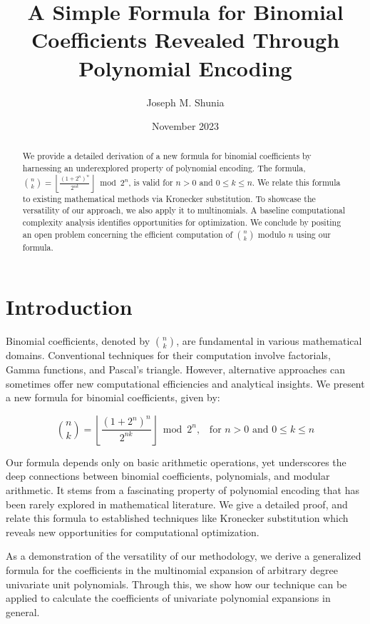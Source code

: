 \documentclass{article}
\title{A Simple Formula for Binomial Coefficients Revealed Through Polynomial Encoding}
\author{Joseph M. Shunia}
\date{November 2023}
\theoremstyle{plain}
\theoremstyle{definition}
\begin{document}
\maketitle
\linespread{1.3}
\begin{abstract}
We provide a detailed derivation of a new formula for binomial coefficients by harnessing an underexplored property of polynomial encoding. The formula, $\binom{n}{k} = \left\lfloor\frac{(1 + 2^{n})^{n}}{2^{n k}}\right\rfloor \bmod{2^{n}}$, is valid for $n > 0$ and $0 \leq k \leq n$. We relate this formula to existing mathematical methods via Kronecker substitution. To showcase the versatility of our approach, we also apply it to multinomials. A baseline computational complexity analysis identifies opportunities for optimization. We conclude by positing an open problem concerning the efficient computation of $\binom{n}{k}$ modulo $n$ using our formula.
\end{abstract}
\linespread{1.0}

\section{Introduction}
Binomial coefficients, denoted by \(\binom{n}{k}\), are fundamental in various mathematical domains. Conventional techniques for their computation involve factorials, Gamma functions, and Pascal's triangle. However, alternative approaches can sometimes offer new computational efficiencies and analytical insights. We present a new formula for binomial coefficients, given by:

\begin{equation}
\binom{n}{k} = \left\lfloor\frac{(1 + 2^{n})^{n}}{2^{n k}}\right\rfloor \bmod{2^{n}} \text{,} \quad \text{for } n > 0 \text{ and } 0 \leq k \leq n
\end{equation}

Our formula depends only on basic arithmetic operations, yet underscores the deep connections between binomial coefficients, polynomials, and modular arithmetic. It stems from a fascinating property of polynomial encoding that has been rarely explored in mathematical literature. We give a detailed proof, and relate this formula to established techniques like Kronecker substitution which reveals new opportunities for computational optimization.

As a demonstration of the versatility of our methodology, we derive a generalized formula for the coefficients in the multinomial expansion of arbitrary degree univariate unit polynomials. Through this, we show how our technique can be applied to calculate the coefficients of univariate polynomial expansions in general.
\end{document}
